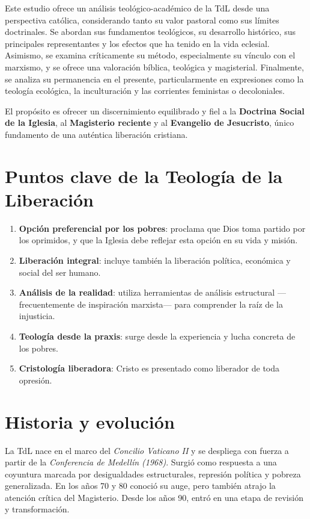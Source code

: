 \documentclass[12pt]{article}
\begin{document}
Este estudio ofrece un análisis teológico-académico de la TdL desde una perspectiva católica, considerando tanto su valor pastoral como sus límites doctrinales. Se abordan sus fundamentos teológicos, su desarrollo histórico, sus principales representantes y los efectos que ha tenido en la vida eclesial. Asimismo, se examina críticamente su método, especialmente su vínculo con el marxismo, y se ofrece una valoración bíblica, teológica y magisterial. Finalmente, se analiza su permanencia en el presente, particularmente en expresiones como la teología ecológica, la inculturación y las corrientes feministas o decoloniales.

El propósito es ofrecer un discernimiento equilibrado y fiel a la \textbf{Doctrina Social de la Iglesia}, al \textbf{Magisterio reciente} y al \textbf{Evangelio de Jesucristo}, único fundamento de una auténtica liberación cristiana.

\section*{Puntos clave de la Teología de la Liberación}

\begin{enumerate}
    \item \textbf{Opción preferencial por los pobres}: proclama que Dios toma partido por los oprimidos, y que la Iglesia debe reflejar esta opción en su vida y misión.
    \item \textbf{Liberación integral}: incluye también la liberación política, económica y social del ser humano.
    \item \textbf{Análisis de la realidad}: utiliza herramientas de análisis estructural —frecuentemente de inspiración marxista— para comprender la raíz de la injusticia.
    \item \textbf{Teología desde la praxis}: surge desde la experiencia y lucha concreta de los pobres.
    \item \textbf{Cristología liberadora}: Cristo es presentado como liberador de toda opresión.
\end{enumerate}

\section*{Historia y evolución}

La TdL nace en el marco del \textit{Concilio Vaticano II} y se despliega con fuerza a partir de la \textit{Conferencia de Medellín (1968)}. Surgió como respuesta a una coyuntura marcada por desigualdades estructurales, represión política y pobreza generalizada. En los años 70 y 80 conoció su auge, pero también atrajo la atención crítica del Magisterio. Desde los años 90, entró en una etapa de revisión y transformación.
\end{document}
